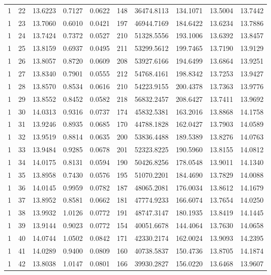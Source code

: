 \begin{longtable}{rrrrrrrrrr}
1 & 22 & 13.6223 & 0.7127 & 0.0622 & 148 & 36474.8113 & 134.1071 & 13.5004 & 13.7442 \\
1 & 23 & 13.7060 & 0.6010 & 0.0421 & 197 & 46944.7169 & 184.6422 & 13.6234 & 13.7886 \\
1 & 24 & 13.7424 & 0.7372 & 0.0527 & 210 & 51328.5556 & 193.1006 & 13.6392 & 13.8457 \\
1 & 25 & 13.8159 & 0.6937 & 0.0495 & 211 & 53299.5612 & 199.7465 & 13.7190 & 13.9129 \\
1 & 26 & 13.8057 & 0.8720 & 0.0609 & 208 & 53927.6166 & 194.6499 & 13.6864 & 13.9251 \\
1 & 27 & 13.8340 & 0.7901 & 0.0555 & 212 & 54768.4161 & 198.8342 & 13.7253 & 13.9427 \\
1 & 28 & 13.8570 & 0.8534 & 0.0616 & 210 & 54223.9155 & 200.4378 & 13.7363 & 13.9776 \\
1 & 29 & 13.8552 & 0.8452 & 0.0582 & 218 & 56832.2457 & 208.6427 & 13.7411 & 13.9692 \\
1 & 30 & 14.0313 & 0.9316 & 0.0737 & 174 & 45832.5381 & 163.2016 & 13.8868 & 14.1758 \\
1 & 31 & 13.9246 & 0.8935 & 0.0685 & 170 & 44788.1828 & 162.0427 & 13.7903 & 14.0589 \\
1 & 32 & 13.9519 & 0.8814 & 0.0635 & 200 & 53836.4488 & 189.5389 & 13.8276 & 14.0763 \\
1 & 33 & 13.9484 & 0.9285 & 0.0678 & 201 & 52323.8225 & 190.5960 & 13.8155 & 14.0812 \\
1 & 34 & 14.0175 & 0.8131 & 0.0594 & 190 & 50426.8256 & 178.0548 & 13.9011 & 14.1340 \\
1 & 35 & 13.8958 & 0.7430 & 0.0576 & 195 & 51070.2201 & 184.4690 & 13.7829 & 14.0088 \\
1 & 36 & 14.0145 & 0.9959 & 0.0782 & 187 & 48065.2081 & 176.0034 & 13.8612 & 14.1679 \\
1 & 37 & 13.8952 & 0.8581 & 0.0662 & 181 & 47774.9233 & 166.6074 & 13.7654 & 14.0250 \\
1 & 38 & 13.9932 & 1.0126 & 0.0772 & 191 & 48747.3147 & 180.1935 & 13.8419 & 14.1445 \\
1 & 39 & 13.9144 & 0.9023 & 0.0772 & 154 & 40051.6678 & 144.4064 & 13.7630 & 14.0658 \\
1 & 40 & 14.0744 & 1.0502 & 0.0842 & 171 & 42330.2174 & 162.0024 & 13.9093 & 14.2395 \\
1 & 41 & 14.0289 & 0.9400 & 0.0809 & 160 & 40738.5837 & 150.4736 & 13.8705 & 14.1874 \\
1 & 42 & 13.8038 & 1.0147 & 0.0801 & 166 & 39930.2827 & 156.0220 & 13.6468 & 13.9607 \\

\end{longtable}
